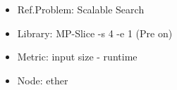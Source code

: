 \begin{frame}
\begin{minipage}{.41\paperwidth}
\begin{figure}
        \begin{itemize}
            \item Ref.Problem: Scalable Search
            \item Library: MP-Slice -s 4 -e 1 (Pre on)
            \item Metric: input size - runtime
            \item Node: ether
        \end{itemize}
    \end{figure}
    \end{minipage}

\end{frame}
